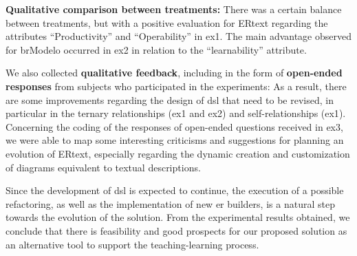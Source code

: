 \item \textbf{Qualitative comparison between treatments:} There was a certain balance between treatments, but with a positive evaluation for ERtext regarding the attributes ``Productivity'' and ``Operability'' in \ac{ex1}.
The main advantage observed for brModelo occurred in \ac{ex2} in relation to the ``learnability'' attribute.

\item We also collected \textbf{qualitative feedback}, including in the form of \textbf{open-ended responses} from subjects who participated in the experiments:
As a result, there are some improvements regarding the design of \ac{dsl} that need to be revised, in particular in the ternary relationships (\ac{ex1} and \ac{ex2}) and self-relationships (\ac{ex1}).
Concerning the coding of the responses of open-ended questions received in \ac{ex3}, we were able to map some interesting criticisms and suggestions for planning an evolution of ERtext, especially regarding the dynamic creation and customization of diagrams equivalent to textual descriptions.

Since the development of \ac{dsl} is expected to continue, the execution of a possible refactoring, as well as the implementation of new \ac{er} builders, is a natural step towards the evolution of the solution.
From the experimental results obtained, we conclude that there is feasibility and good prospects for our proposed solution as an alternative tool to support the teaching-learning process.


